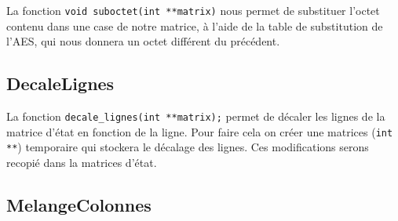 \documentclass[french, 12pt]{article}
\begin{document}
	La fonction \verb|void suboctet(int **matrix)|  nous permet de substituer l'octet contenu dans une case de notre matrice, à l'aide de la table de substitution de l'AES, qui nous donnera un octet différent du précédent.
		
	\subsection*{DecaleLignes}
	
	La fonction \verb|decale_lignes(int **matrix);| permet de décaler les lignes de la matrice d'état en fonction de la ligne. Pour faire cela on créer une matrices (\verb|int **|) temporaire qui stockera le décalage des lignes. Ces modifications serons recopié dans la matrices d'état.
	
	\newpage
	
	\subsection*{MelangeColonnes}
	
\end{document}
